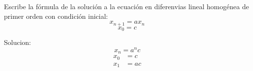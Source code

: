 \documentclass{article}
\begin{document}
Escribe la fórmula de la solución a la ecuación en diferenvias lineal homogénea de primer orden con condición inicial:
$$x_{n+1}=ax_{n}$$
$$x_{0}=c$$

Solucion: $$x_{n}=a^{n}c$$
\begin{align*}
  x_{0}&=c\\
  x_1&=ac
\end{align*}
\end{document}
